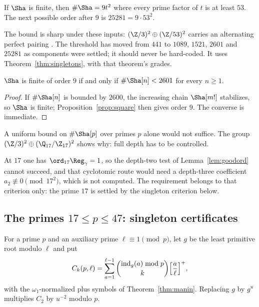 \begin{proposition}\label{prop:square}
If $\Sha$ is finite, then $\#\Sha=9t^2$ where every prime factor of $t$ is at least $53$. The next possible order after $9$ is $25281=9\cdot53^2$.
\end{proposition}
The bound is sharp under these inputs: $(\Z/3)^2\oplus(\Z/53)^2$ carries an alternating perfect pairing \cite{poonenstoll}. The threshold has moved from $441$ to $1089$, $1521$, $2601$ and $25281$ as components were settled; it should never be hard-coded. It uses Theorem~\ref{thm:singletons}, with that theorem's grades.

\begin{proposition}\label{prop:uniform}
$\Sha$ is finite of order $9$ if and only if $\#\Sha[n]<2601$ for every $n\ge1$.
\end{proposition}
\begin{proof}
If $\#\Sha[n]$ is bounded by $2600$, the increasing chain $\Sha[m!]$ stabilizes, so $\Sha$ is finite; Proposition~\ref{prop:square} then gives order $9$. The converse is immediate.
\end{proof}
A uniform bound on $\#\Sha[p]$ over primes $p$ alone would not suffice. The group $(\Z/3)^2\oplus(\Q_{17}/\Z_{17})^2$ shows why: full depth has to be controlled.

\begin{remark}\label{rem:17}
At $17$ one has $\ord_{17}\Reg_\gamma=1$, so the depth-two test of Lemma~\ref{lem:goodord} cannot succeed, and that cyclotomic route would need a depth-three coefficient $a_2\not\equiv0\pmod{17^2}$, which is not computed. The requirement belongs to that criterion only: the prime $17$ is settled by the singleton criterion below.
\end{remark}

\subsection[The primes 17 to 47]{The primes $17\le p\le47$: singleton certificates}\label{subsec:singletons}
For a prime $p$ and an auxiliary prime $\ell\equiv1\pmod p$, let $g$ be the least primitive root modulo $\ell$ and put
\[
C_k(p,\ell)=\sum_{a=1}^{\ell-1}\binom{\operatorname{ind}_g(a)\bmod p}{k}\Bigl[\frac a\ell\Bigr]^+ ,
\]
with the $\omega_1$-normalized plus symbols of Theorem~\ref{thm:manin}. Replacing $g$ by $g^u$ multiplies $C_2$ by $u^{-2}$ modulo $p$.

